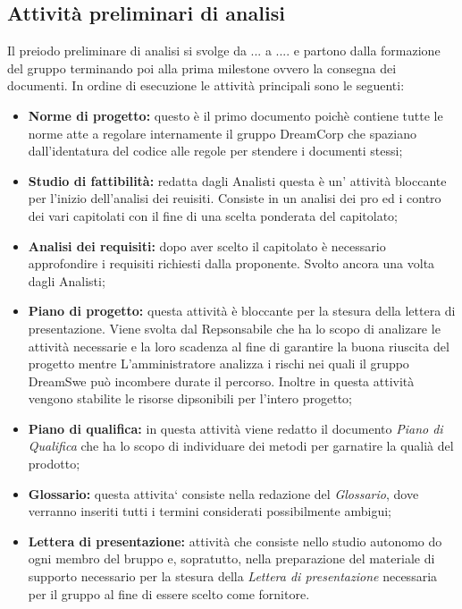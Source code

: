 	\subsection{Attività preliminari di analisi}
	Il preiodo preliminare di analisi si svolge da ... a .... e partono dalla formazione del gruppo terminando poi alla prima milestone ovvero la consegna dei documenti. \newline
 	In ordine di esecuzione le attività principali sono le seguenti:
\begin{itemize}
	\item{\textbf{Norme di progetto:} questo è il primo documento poichè contiene tutte le norme atte a regolare internamente il gruppo DreamCorp che spaziano dall'identatura del codice alle regole per stendere i documenti stessi;}
	\item{\textbf{Studio di fattibilità:} redatta dagli Analisti questa è un' attività bloccante per l'inizio dell'analisi dei reuisiti. Consiste in un analisi dei pro ed i contro dei vari capitolati con il fine di una scelta ponderata del capitolato;}
	\item{\textbf{Analisi dei requisiti:} dopo aver scelto il capitolato è necessario approfondire i requisiti richiesti dalla proponente. Svolto ancora una volta dagli Analisti;}
	\item{\textbf{Piano di progetto:} questa attività è bloccante per la stesura della lettera di presentazione. Viene svolta dal Repsonsabile che ha lo scopo di analizare le attività necessarie e la loro scadenza al fine di garantire la  buona riuscita del progetto mentre L'amministratore analizza i rischi nei quali il gruppo DreamSwe può incombere durate il percorso. Inoltre in questa attività vengono stabilite le risorse dipsonibili per l'intero progetto;}
	\item{\textbf{Piano di qualifica:} in questa attività viene redatto il documento \textit{Piano di Qualifica} che ha lo scopo di individuare dei metodi per garnatire la qualià del prodotto;}
	\item{\textbf{Glossario:} questa attivita` consiste nella redazione del \textit{Glossario}, dove verranno inseriti tutti i termini considerati possibilmente ambigui;} 
	\item{\textbf{Lettera di presentazione:} attività che consiste nello studio autonomo do ogni membro del bruppo e, sopratutto, nella preparazione del materiale di supporto necessario per la stesura della \textit{Lettera di presentazione} necessaria per il gruppo al fine di essere scelto come fornitore.}
\end{itemize}
